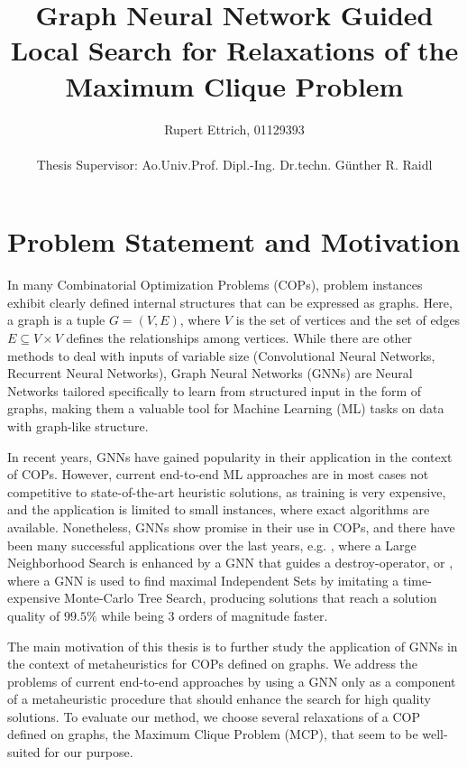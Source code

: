 \documentclass [11pt]{article}
\title{Graph Neural Network Guided Local Search for Relaxations of the Maximum Clique Problem}
\author{Rupert Ettrich, 01129393 \\\\ Thesis Supervisor: Ao.Univ.Prof. Dipl.-Ing. Dr.techn. Günther R. Raidl}
\date{}
\begin{document}
	
\maketitle 
 
\section{Problem Statement and Motivation}

In many Combinatorial Optimization Problems (COPs), problem instances exhibit clearly defined internal structures that can be expressed as graphs. Here, a graph is a tuple $G = (V, E)$, where $V$ is the set of vertices and the set of edges $E \subseteq V \times V$ defines the relationships among vertices. While there are other methods to deal with inputs of variable size (Convolutional Neural Networks, Recurrent Neural Networks), Graph Neural Networks (GNNs) are Neural Networks tailored specifically to learn from structured input in the form of graphs, making them a valuable tool for Machine Learning (ML) tasks on data with graph-like structure.   

In recent years, GNNs have gained popularity in their application in the context of COPs. However, current end-to-end ML approaches are in most cases not competitive to state-of-the-art heuristic solutions, as training is very expensive, and the application is limited to small instances, where exact algorithms are available. Nonetheless, GNNs show promise in their use in COPs, and there have been many successful applications over the last years, e.g. 
\cite{Oberweger2022}, where a Large Neighborhood Search is enhanced by a GNN that guides a destroy-operator, or \cite{NEURIPS2021_0db2e204}, where a GNN is used to find maximal Independent Sets by imitating a time-expensive Monte-Carlo Tree Search, producing solutions that reach a solution quality of $99.5\%$ while being 3 orders of magnitude faster. 

The main motivation of this thesis is to further study the application of GNNs in the context of metaheuristics for COPs defined on graphs. We address the problems of current end-to-end approaches by using a GNN only as a component of a metaheuristic procedure that should enhance the search for high quality solutions. To evaluate our method, we choose several relaxations of a COP defined on graphs, the Maximum Clique Problem (MCP), that seem to be well-suited for our purpose. 
\end{document}
